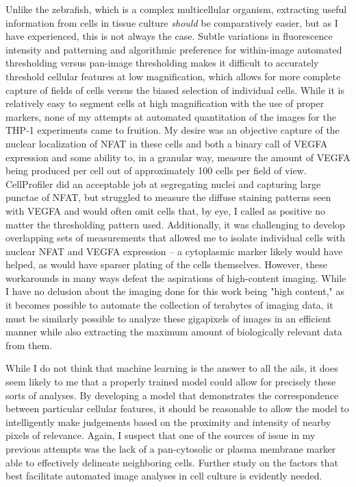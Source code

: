 Unlike the zebrafish, which is a complex multicellular organism, extracting useful information from cells in tissue culture \textit{should} be comparatively easier, but as I have experienced, this is not always the case. Subtle variations in fluorescence intensity and patterning and algorithmic preference for within-image automated thresholding versus pan-image thresholding makes it difficult to accurately threshold cellular features at low magnification, which allows for more complete capture of fields of cells versus the biased selection of individual cells. While it is relatively easy to segment cells at high magnification with the use of proper markers, none of my attempts at automated quantitation of the images for the THP-1 experiments came to fruition. My desire was an objective capture of the nuclear localization of NFAT in these cells and both a binary call of VEGFA expression and some ability to, in a granular way, measure the amount of VEGFA being produced per cell out of approximately 100 cells per field of view. CellProfiler \citep{Carpenter2006, Kamentsky2011, McQuin2018, Stirling2021} did an acceptable job at segregating nuclei and capturing large punctae of NFAT, but struggled to measure the diffuse staining patterns seen with VEGFA and would often omit cells that, by eye, I called as positive no matter the thresholding pattern used. Additionally, it was challenging to develop overlapping sets of measurements that allowed me to isolate individual cells with nuclear NFAT and VEGFA expression -- a cytoplasmic marker likely would have helped, as would have sparser plating of the cells themselves. However, these workarounds in many ways defeat the aspirations of high-content imaging. While I have no delusion about the imaging done for this work being "high content," as it becomes possible to automate the collection of terabytes of imaging data, it must be similarly possible to analyze these gigapixels of images in an efficient manner while also extracting the maximum amount of biologically relevant data from them.

While I do not think that machine learning is the answer to all the ails, it does seem likely to me that a properly trained model could allow for precisely these sorts of analyses. By developing a model that demonstrates the correspondence between particular cellular features, it should be reasonable to allow the model to intelligently make judgements based on the proximity and intensity of nearby pixels of relevance. Again, I suspect that one of the sources of issue in my previous attempts was the lack of a pan-cytosolic or plasma membrane marker able to effectively delineate neighboring cells. Further study on the factors that best facilitate automated image analyses in cell culture is evidently needed.

